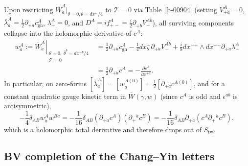 \documentclass[11pt]{article}
\numberwithin{equation}{section}
\numberwithin{figure}{section}
\numberwithin{table}{section}
\begin{document}
Upon restricting $\bar W_{\dot a}^A|_{\theta=0,\bar\theta=dx^-/4}$ to $\mathcal T=0$ via Table~\ref{b-00904} (setting $V_{+\dot a}^A=0$, $\bar\lambda_{\dot a}^A=\tfrac12\partial_{+\dot a}c_{\mathrm{gh}}^A$, $\lambda_+^A=0$, and $D^A=if_{+-}^A=\tfrac i2\partial_{+\dot b}V_-^{A\dot b}$), all surviving components collapse into the holomorphic derivative of $c^A$:
\begin{equation}\label{footnote-16--eq3.4}
\begin{aligned}
w_{\dot a}^A
:=\left.\bar W_{\dot a}^A\right|_{\substack{\theta=0,\;\bar\theta^{\dot b}=dx^{-\dot b}/4\\\mathcal T=0}}
&=\frac12\partial_{+\dot a}c_{\mathrm{gh}}^A
-\frac14dx^-_{\dot b}\partial_{+\dot a}V_-^{A\dot b}
+\frac i8dx^{-\dot+}\wedge dx^{-\dot-}
 \partial_{+\dot a}\lambda_-^A\\
&=\frac12\partial_{+\dot a}c^A
=-\frac{\partial c^A}{\partial x^{+\dot a}}.
\end{aligned}
\end{equation}
In particular, on zero-forms $[\bar\lambda_{\dot a}^A]=[w_{\dot a}^{A(0)}]=\tfrac12[\partial_{+\dot a}c^{A(0)}]$, and for a constant quadratic gauge kinetic term in $\bar W(\gamma,w)$ (since $c^A$ is odd and $\epsilon^{\dot a\dot b}$ is antisymmetric),
\begin{equation}\label{b-00931}
-\frac14\delta_{AB}w_{\dot a}^Aw^{B\dot a}
=-\frac1{16}\delta_{AB}(\partial_{+\dot a}c^A)(\partial_+{}^{\dot a}c^B)
=-\frac1{16}\delta_{AB}\partial_{+\dot a}
  (c^A\partial_+{}^{\dot a}c^B),
\end{equation}
which is a holomorphic total derivative and therefore drops out of $S_{\mathrm{tw}}$.

\subsection{BV completion of the Chang--Yin letters}\label{bv-completion-of-the-changyin-letters}
\end{document}
